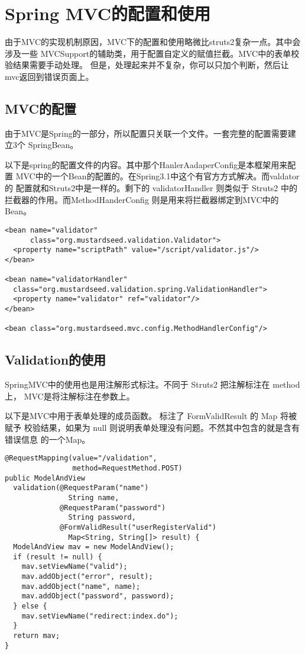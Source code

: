 \section{Spring MVC的配置和使用}
由于MVC的实现机制原因，MVC下的配置和使用略微比struts2复杂一点。其中会涉及一些
MVCSupport的辅助类，用于配置自定义的赋值拦截。MVC中的表单校验结果需要手动处理。
但是，处理起来并不复杂，你可以只加个判断，然后让mvc返回到错误页面上。

\subsection{MVC的配置}
由于MVC是Spring的一部分，所以配置只关联一个文件。一套完整的配置需要建立3个
SpringBean。

以下是spring的配置文件的内容。其中那个HanlerAadaperConfig是本框架用来配置
MVC中的一个Bean的配置的。在Spring3.1中这个有官方方式解决。而valdator的
配置就和Struts2中是一样的。剩下的 validatorHandler 则类似于 Struts2 中的
拦截器的作用。而MethodHanderConfig 则是用来将拦截器绑定到MVC中的Bean。

\begin{verbatim}
<bean name="validator"
      class="org.mustardseed.validation.Validator">
  <property name="scriptPath" value="/script/validator.js"/>
</bean>
  
<bean name="validatorHandler"
  class="org.mustardseed.validation.spring.ValidationHandler">
  <property name="validator" ref="validator"/>
</bean>

<bean class="org.mustardseed.mvc.config.MethodHandlerConfig"/>
\end{verbatim}

\subsection{Validation的使用}

SpringMVC中的使用也是用注解形式标注。不同于 Struts2 把注解标注在 method 上，
MVC是将注解标注在参数上。


以下是MVC中用于表单处理的成员函数。 标注了 FormValidResult 的 Map 将被赋予
校验结果，如果为 null 则说明表单处理没有问题。不然其中包含的就是含有错误信息
的一个Map。
\begin{verbatim}
@RequestMapping(value="/validation",
                method=RequestMethod.POST)
public ModelAndView 
  validation(@RequestParam("name")
               String name,
             @RequestParam("password")
               String password,
             @FormValidResult("userRegisterValid")
               Map<String, String[]> result) {
  ModelAndView mav = new ModelAndView();
  if (result != null) {
    mav.setViewName("valid");
    mav.addObject("error", result);
    mav.addObject("name", name);
    mav.addObject("password", password);
  } else {
    mav.setViewName("redirect:index.do");
  }
  return mav;
}
\end{verbatim}
